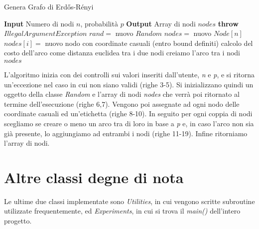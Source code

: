 \documentclass[12pt,a4paper]{report}
\begin{document}
\begin{algorithm}
\caption{Genera Grafo di Erdős-Rényi}
\label{alg:ER-gen}
\begin{algorithmic}[1]
    \State \textbf{Input} Numero di nodi $n$, probabilità $p$
    \State \textbf{Output} Array di nodi $nodes$
        \State \textbf{throw} $IllegalArgumentException$
    \EndIf
    \State $rand=$ nuovo $Random$
    \State $nodes=$ nuovo $Node[n]$
        \State $nodes[i]=$ nuovo nodo con coordinate casuali (entro bound definiti)
    \EndFor
                \State calcolo del costo dell'arco come distanza euclidea tra i due nodi
                    \State creiamo l'arco tra i nodi
                \EndIf
            \EndIf
        \EndFor
    \EndFor
    \State \Return $nodes$
\end{algorithmic}
\end{algorithm}

L'algoritmo inizia con dei controlli sui valori inseriti dall'utente, \textit{n} e \textit{p}, e si ritorna un'eccezione nel caso in cui non siano validi (righe 3-5). Si inizializzano quindi un oggetto della classe \textit{Random} e l'array di nodi \textit{nodes} che verrà poi ritornato al termine dell'esecuzione (righe 6,7). Vengono poi assegnate ad ogni nodo delle coordinate casuali ed un'etichetta (righe 8-10).
In seguito per ogni coppia di nodi scegliamo se creare o meno un arco tra di loro in base a \textit{p} e, in caso l'arco non sia già presente, lo aggiungiamo ad entrambi i nodi (righe 11-19). 
Infine ritorniamo l'array di nodi.

\section{Altre classi degne di nota}\label{se:classi-nota}

Le ultime due classi implementate sono \textit{Utilities}, in cui vengono scritte subroutine utilizzate frequentemente, ed \textit{Experiments}, in cui si trova il \textit{main()} dell'intero progetto.
\end{document}
